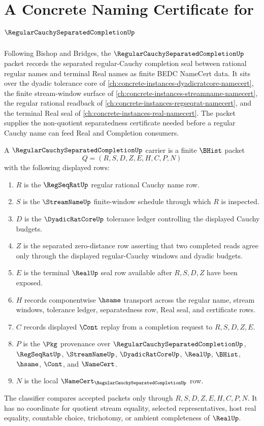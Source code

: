 \chapter{A Concrete Naming Certificate for $\RegularCauchySeparatedCompletionUp$}
\label{ch:concrete-instances-regular-cauchy-separated-completion-namecert}

Following Bishop and Bridges, the $\RegularCauchySeparatedCompletionUp$ packet records the separated regular-Cauchy completion seal between rational regular names and terminal Real names as finite BEDC NameCert data. It sits over the dyadic tolerance core of \autoref{ch:concrete-instances-dyadicratcore-namecert}, the finite stream-window surface of \autoref{ch:concrete-instances-streamname-namecert}, the regular rational readback of \autoref{ch:concrete-instances-regseqrat-namecert}, and the terminal Real seal of \autoref{ch:concrete-instances-real-namecert}. The packet supplies the non-quotient separatedness certificate needed before a regular Cauchy name can feed Real and Completion consumers.

\begin{definition}
\label{def:regular-cauchy-separated-completion-carrier}
A $\RegularCauchySeparatedCompletionUp$ carrier is a finite $\BHist$ packet
$$
Q=(R,S,D,Z,E,H,C,P,N)
$$
with the following displayed rows:
\begin{enumerate}
\item $R$ is the $\RegSeqRatUp$ regular rational Cauchy name row.
\item $S$ is the $\StreamNameUp$ finite-window schedule through which $R$ is inspected.
\item $D$ is the $\DyadicRatCoreUp$ tolerance ledger controlling the displayed Cauchy budgets.
\item $Z$ is the separated zero-distance row asserting that two completed reads agree only through the displayed regular-Cauchy windows and dyadic budgets.
\item $E$ is the terminal $\RealUp$ seal row available after $R,S,D,Z$ have been exposed.
\item $H$ records componentwise $\hsame$ transport across the regular name, stream windows, tolerance ledger, separatedness row, Real seal, and certificate rows.
\item $C$ records displayed $\Cont$ replay from a completion request to $R,S,D,Z,E$.
\item $P$ is the $\Pkg$ provenance over $\RegularCauchySeparatedCompletionUp$, $\RegSeqRatUp$, $\StreamNameUp$, $\DyadicRatCoreUp$, $\RealUp$, $\BHist$, $\hsame$, $\Cont$, and $\NameCert$.
\item $N$ is the local $\NameCert_{\RegularCauchySeparatedCompletionUp}$ row.
\end{enumerate}
The classifier compares accepted packets only through $R,S,D,Z,E,H,C,P,N$. It has no coordinate for quotient stream equality, selected representatives, host real equality, countable choice, trichotomy, or ambient completeness of $\RealUp$.
\end{definition}

